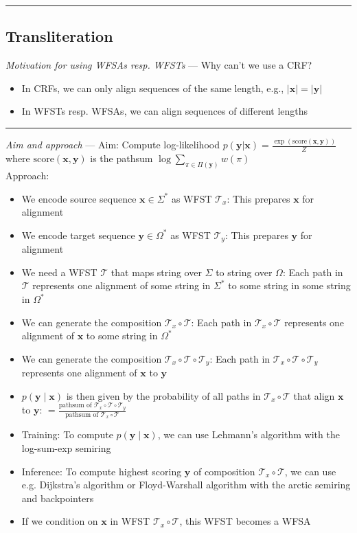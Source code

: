 {\color{black}\hrule height 0.001mm}

\subsection*{Transliteration}
\emph{Motivation for using WFSAs resp. WFSTs} ---
Why can't we use a CRF?
\begin{itemize}
    \item In CRFs, we can only align sequences of the same length, e.g., $|\boldsymbol{x}| = |\boldsymbol{y}|$
    \item In WFSTs resp. WFSAs, we can align sequences of different lengths
\end{itemize}

{\color{lightgray}\hrule height 0.001mm}

\emph{Aim and approach} ---
Aim: Compute log-likelihood $p(\boldsymbol{y}|\boldsymbol{x}) = \frac{\exp(\textrm{score}(\boldsymbol{x},\boldsymbol{y}))}{Z}$ where $\textrm{score}(\boldsymbol{x}, \boldsymbol{y})$ is the pathsum $\log \sum_{\pi \in \Pi(\boldsymbol{y})} w(\pi)$\\
Approach:
\begin{itemize}
    \item We encode source sequence $\boldsymbol{x} \in \Sigma^*$ as WFST $\mathcal{T}_x$: This prepares $\boldsymbol{x}$ for alignment 
    \item We encode target sequence $\boldsymbol{y} \in \Omega^*$ as WFST $\mathcal{T}_y$: This prepares $\boldsymbol{y}$ for alignment
    \item We need a WFST $\mathcal{T}$ that maps string over $\Sigma$ to string over $\Omega$: Each path in $\mathcal{T}$ represents one alignment of some string in $\Sigma^*$ to some string in some string in $\Omega^*$
    \item We can generate the composition $\mathcal{T}_x \circ \mathcal{T}$: Each path in $\mathcal{T}_x \circ \mathcal{T}$ represents one alignment of $\boldsymbol{x}$ to some string in $\Omega^*$
    \item We can generate the composition $\mathcal{T}_x \circ \mathcal{T} \circ \mathcal{T}_y$: Each path in $\mathcal{T}_x \circ \mathcal{T} \circ \mathcal{T}_y$ represents one alignment of $\boldsymbol{x}$ to $\boldsymbol{y}$
    \item $p(\boldsymbol{y} \mid \boldsymbol{x})$ is then given by the probability of all paths in $\mathcal{T}_x \circ \mathcal{T}$ that align $\boldsymbol{x}$ to $\boldsymbol{y}$: $= \frac{\textrm{pathsum of } \mathcal{T}_x \circ \mathcal{T} \circ \mathcal{T}_y}{\textrm{pathsum of } \mathcal{T}_x \circ \mathcal{T}}$
    \item Training: To compute $p(\boldsymbol{y} \mid \boldsymbol{x})$, we can use Lehmann's algorithm with the log-sum-exp semiring
    \item Inference: To compute highest scoring $\boldsymbol{y}$ of composition $\mathcal{T}_x \circ \mathcal{T}$, we can use e.g. Dijkstra's algorithm or Floyd-Warshall algorithm with the arctic semiring and backpointers
    \item If we condition on $\boldsymbol{x}$ in WFST $\mathcal{T}_x \circ \mathcal{T}$, this WFST becomes a WFSA
\end{itemize}

